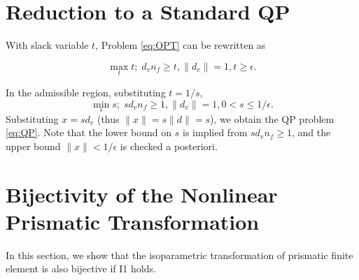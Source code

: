 \section{Reduction to a Standard QP}
\label{app:qp}

With slack variable $t$, Problem \ref{eq:OPT} can be rewritten as

$$\max_t t;\; d_v n_f \geq t, \|d_v\| = 1, t \geq {\epsilon}.$$

In the admissible region, substituting $t = 1/s$, 
$$\min_s s;\; s d_v n_f \geq 1, \|d_v\| = 1, {0< s \leq 1/\epsilon}.$$
Substituting $x=s d_v$ (thus $\|x\| = s\|d\| = s$), we obtain the QP problem \ref{eq:QP}. Note that the lower bound on $s$ is implied from $s d_v n_f \geq 1$, and the upper bound $\|x\| < 1/\epsilon$ is checked a posteriori.

%

\section{Bijectivity of the Nonlinear Prismatic Transformation}
\label{app:bilinear}
In this section, we show
that the isoparametric transformation of prismatic finite element \cite{ciarlet1991basic} is also bijective if I1 holds.%

